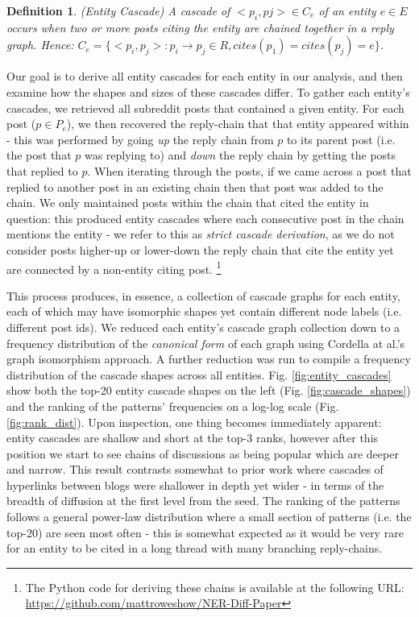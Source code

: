 \documentclass[journal,10pt,draftclsnofoot,onecolumn]{IEEEtran}
\newtheorem{mydef}{Definition}
\begin{document}
\begin{mydef}
(Entity Cascade) A cascade of ${<p_i, pj>} \in C_e$ of an entity $e \in E$ occurs when two or more posts citing the entity are chained together in a reply graph. 
Hence: $C_e = \{<p_i, p_j> : p_i \rightarrow p_j \in R, cites(p_1) = cites(p_j) = e\}$.
\end{mydef}

Our goal is to derive all entity cascades for each entity in our analysis, and then examine how the shapes and sizes of these cascades differ.
To gather each entity's cascades, we retrieved all subreddit posts that contained a given entity.
For each post ($p \in P_e$), we then recovered the reply-chain that that entity appeared within - this was performed by going \emph{up} the reply chain from $p$ to its parent post (i.e. the post that $p$ was replying to) and \emph{down} the reply chain by getting the posts that replied to $p$.
When iterating through the posts, if we came across a post that replied to another post in an existing chain then that post was added to the chain.
We only maintained posts within the chain that cited the entity in question: this produced entity cascades where each consecutive post in the chain mentions the entity - we refer to this as \emph{strict cascade derivation}, as we do not consider posts higher-up or lower-down the reply chain that cite the entity yet are connected by a non-entity citing post. \footnote{The Python code for deriving these chains is available at the following URL: \url{https://github.com/mattroweshow/NER-Diff-Paper}}

This process produces, in essence, a collection of cascade graphs for each entity, each of which may have isomorphic shapes yet contain different node labels (i.e. different post ids).
We reduced each entity's cascade graph collection down to a frequency distribution of the \emph{canonical form} of each graph using Cordella at al.'s \cite{cordella2001improved} graph isomorphism approach.
A further reduction was run to compile a frequency distribution of the cascade shapes across all entities.
Fig. \ref{fig:entity_cascades} show both the top-20 entity cascade shapes on the left (Fig. \ref{fig:cascade_shapes}) and the ranking of the patterns' frequencies on a log-log scale (Fig. \ref{fig:rank_dist}).
Upon inspection, one thing becomes immediately apparent: entity cascades are shallow and short at the top-3 ranks, however after this position we start to see chains of discussions as being popular which are deeper and narrow.
This result contrasts somewhat to prior work \cite{leskovec2007patterns} where cascades of hyperlinks between blogs were shallower in depth yet wider - in terms of the breadth of diffusion at the first level from the seed. 
The ranking of the patterns follows a general power-law distribution where a small section of patterns (i.e. the top-20) are seen most often - this is somewhat expected as it would be very rare for an entity to be cited in a long thread with many branching reply-chains.
\end{document}
